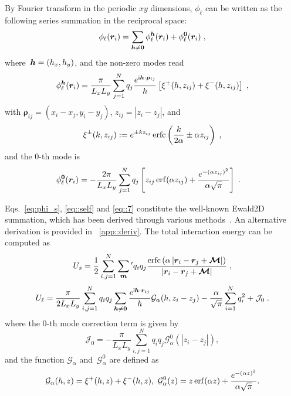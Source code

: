 \begin{lem}\label{thm::SpectralExpansion}
	By Fourier transform in the periodic $xy$ dimensions, $\phi_{\ell}$ can be written as the following series summation in the reciprocal space:
	\begin{equation}\label{eq::7} 
		\phi_{\ell}(\bm{r}_{i}) = \sum_{\boldsymbol{h} \neq \bm{0}} \phi_{\ell}^{\boldsymbol{h}}(\bm{r}_{i}) + \phi_{\ell}^{\bm{0}}(\bm{r}_{i})\;,
	\end{equation}
	where~$\boldsymbol{h} = (h_x, h_y)$, and the non-zero modes read
	\begin{equation}\label{eq:philk}
		\phi_{\ell}^{\boldsymbol{h}}(\bm{r}_{i}) = \frac{\pi}{L_x L_y} \sum_{j = 1}^N q_{j} \frac{e^{\mathrm{i} \boldsymbol{h} \cdot \boldsymbol{\rho}_{ij}}}{h} \left[\xi^{+}(h, z_{ij})+\xi^{-}(h, z_{ij})\right]\;,
	\end{equation}
	with $\bm{\rho}_{ij}=(x_{i}-x_{j},y_{i}-y_{j})$, $z_{ij}=|z_{i}-z_{j}|$, and
	\begin{equation}\label{eq::9}
		\xi^{\pm}(k, z_{ij}) := e^{\pm k z_{ij}} \operatorname{erfc} \left( \frac{k}{2 \alpha} \pm \alpha z_{ij}\right)\;,
	\end{equation} 
	and the 0-th mode is
	\begin{align}\label{eq:phil0}
		\phi_{\ell}^{\bm{0}}(\bm{r}_{i}) &= -\frac{2\pi}{L_x L_y} \sum_{j = 1}^N q_{j} \left[ {z_{ij}} \operatorname{erf}(\alpha {z_{ij}}) + \frac{e^{-(\alpha z_{ij})^2}}{\alpha \sqrt{\pi}}  \right]\;.
	\end{align}
\end{lem}

Eqs.~\eqref{eq:phi_s}, \eqref{eq::self} and \eqref{eq::7} constitute the well-known Ewald2D summation, which has been derived through various methods~\cite{parry1975electrostatic,tornberg2016ewald,heyes1977molecular,de1979electrostatic,PhysRevB.61.6706}.
An alternative derivation is provided in ~\ref{app::deriv}.
The total interaction energy can be computed as
\begin{equation}\label{eq::Us_Ewald2D}
    U_{s} =  \frac{1}{2} \sum_{i,j=1}^N \sum_{\bm{m}}{}^\prime q_i q_{j} \frac{\text{erfc}\left(\alpha \left|\bm{r}_i - \bm{r}_{j} + \boldsymbol{\mathcal{M}}\right|\right)}{\left|\bm{r}_i-\bm{r}_{j} + \boldsymbol{\mathcal{M}}\right|}\;,
\end{equation}
\begin{equation}\label{eq::Ul_Ewald2D}
    U_{\ell} =  \frac{\pi}{2L_xL_y}\sum_{i, j=1}^N  q_iq_{j} \sum_{\boldsymbol{h}\neq \boldsymbol{0}}\frac{e^{\mathsf i \boldsymbol{h}\cdot \boldsymbol{r}_{ij}}}{h}\mathcal{G}_{\alpha}(h,z_i - z_{j})  - \frac{\alpha}{\sqrt{\pi}}\sum_{i=1}^{N}q_i^2+\mathcal{J}_0\;.
\end{equation}
where the 0-th mode correction term is given by
\begin{equation}\label{eq::J0_Ewald2D}
\mathcal J_0 = -\frac{\pi}{L_xL_y}\sum_{i,j=1}^{N} q_iq_{j}\mathcal{G}_{\alpha}^0(|z_i-z_{j}|),
\end{equation}
and the function $\mathcal{G}_{\alpha}$ and~$\mathcal{G}_{\alpha}^0$ are defined as
\begin{equation}\label{eq::G_Ewald2D}
    \mathcal{G}_{\alpha}(h,z) = \xi^{+}(h, z)+\xi^{-}(h, z),~\mathcal{G}_{\alpha}^0(z) = {z} \operatorname{erf}(\alpha {z}) + \frac{e^{-(\alpha z)^2}}{\alpha \sqrt{\pi}}.
\end{equation}

